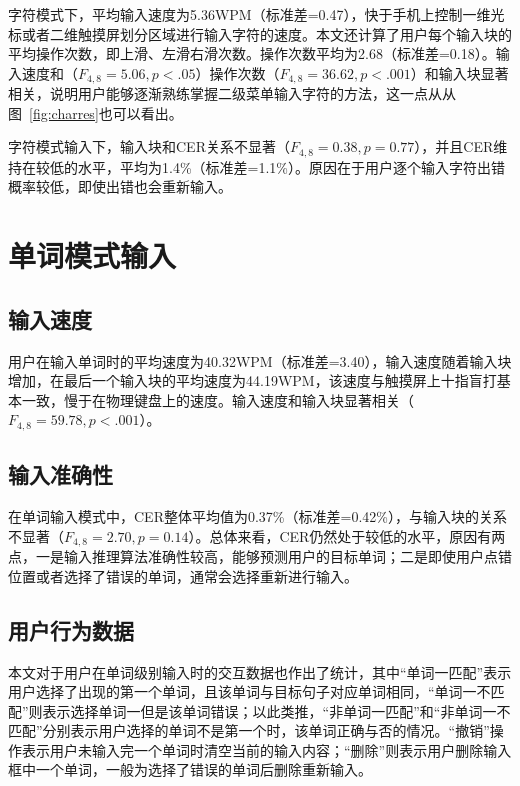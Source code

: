 字符模式下，平均输入速度为5.36WPM（标准差=0.47），快于手机上控制一维光标或者二维触摸屏划分区域进行输入字符的速度\cite{2018forceboard}\cite{1dhandwriting}。本文还计算了用户每个输入块的平均操作次数，即上滑、左滑右滑次数。操作次数平均为2.68（标准差=0.18）。输入速度和（$F_{4,8}=5.06, p < .05$）操作次数（$F_{4,8}=36.62, p < .001$）和输入块显著相关，说明用户能够逐渐熟练掌握二级菜单输入字符的方法，这一点从从图~\ref{fig:charres}也可以看出。

字符模式输入下，输入块和CER关系不显著（$F_{4,8}=0.38, p =0.77$），并且CER维持在较低的水平，平均为1.4\%（标准差=1.1\%）。原因在于用户逐个输入字符出错概率较低，即使出错也会重新输入。

\section{单词模式输入}

\subsection{输入速度}
用户在输入单词时的平均速度为40.32WPM（标准差=3.40），输入速度随着输入块增加，在最后一个输入块的平均速度为44.19WPM，该速度与触摸屏上十指盲打基本一致\cite{2018shitoast}，慢于在物理键盘上的速度。输入速度和输入块显著相关（$F_{4,8}=59.78, p < .001$）。

\subsection{输入准确性}

在单词输入模式中，CER整体平均值为0.37\%（标准差=0.42\%），与输入块的关系不显著（$F_{4,8}=2.70, p =0.14$）。总体来看，CER仍然处于较低的水平，原因有两点，一是输入推理算法准确性较高，能够预测用户的目标单词；二是即使用户点错位置或者选择了错误的单词，通常会选择重新进行输入。

\subsection{用户行为数据}
本文对于用户在单词级别输入时的交互数据也作出了统计，其中“单词一匹配”表示用户选择了出现的第一个单词，且该单词与目标句子对应单词相同，“单词一不匹配”则表示选择单词一但是该单词错误；以此类推，“非单词一匹配”和“非单词一不匹配”分别表示用户选择的单词不是第一个时，该单词正确与否的情况。“撤销”操作表示用户未输入完一个单词时清空当前的输入内容；“删除”则表示用户删除输入框中一个单词，一般为选择了错误的单词后删除重新输入。

